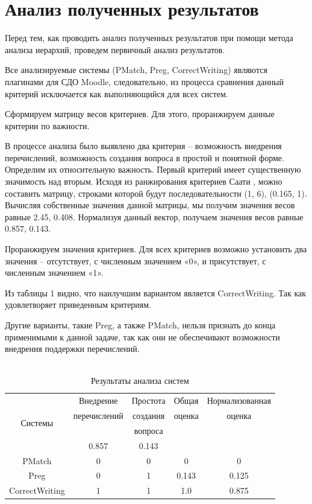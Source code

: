 \documentclass[a4paper,english,russian]{G2-105}
\begin{document}
\section{Анализ полученных результатов}
\par Перед тем, как проводить анализ полученных результатов при помощи метода анализа иерархий,  проведем первичный анализ результатов.
\par Все анализируемые системы (PMatch, Preg, CorrectWriting) являются плагинами для СДО Moodle, следовательно, из процесса сравнения данный критерий исключается как выполняющийся для всех систем.
\par Сформируем матрицу весов критериев. Для этого, проранжируем данные критерии по важности.
\par В процессе анализа было выявлено два критерия – возможность внедрения перечислений, возможность создания вопроса в простой и понятной форме. Определим их относительную важность.  Первый критерий имеет существенную значимость над вторым. Исходя из ранжирования критериев Саати \cite{5},  можно составить матрицу, строками которой будут последовательности (1, 6), (0.165, 1). Вычисляя собственные значения данной матрицы, мы получим значения весов равные 2.45,  0.408. Нормализуя данный вектор, получаем значения весов  равные  0.857, 0.143. 
\par Проранжируем значения критериев. Для всех критериев возможно установить два значения – отсутствует, с численным значением «0», и присутствует,  с численным значением «1».
\par Из таблицы 1 видно, что наилучшим вариантом является CorrectWriting. Так как удовлетворяет приведенным критериям.
\par Другие варианты, такие Preg, а также PMatch, нельзя признать до конца применимыми к данной задаче, так как они не обеспечивают возможности внедрения поддержки перечислений. 
\\ \\ \ttl \ttl \ttl\vspace*{14pt}
\begin{longtable}{|c|c|c|c|c|}
    \caption{Результаты анализа систем}\\ \hline
    \multirow{4}{*}{Системы} & Внедрение & Простота & Общая & Нормализованная \\ 
                                    & перечислений & создания & оценка & оценка \\ 
                                    &   & вопроса & &  \\ \cline{2-5} 
                                    & 0.857 & 0.143 & &\\ \hline \endhead
    PMatch & 0 & 0 & 0 & 0 \\ \hline
    Preg & 0 & 1 & 0.143 & 0.125 \\ \hline
    CorrectWriting & 1 & 1 & 1.0 & 0.875 \\  
\end{longtable}
\end{document}
